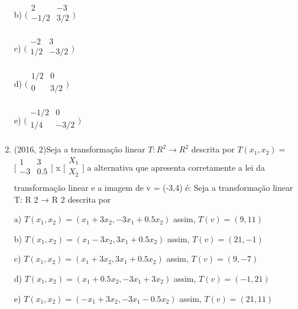 \documentclass{article}
\begin{document}
\begin{enumerate}
b)
$\Bigg(
    \begin{array}{cc}
    2 & -3 \\
    -1/2 & 3/2 \\
\end{array}\Bigg)$

c)
$\Bigg(
    \begin{array}{cc}
    -2 & 3 \\
    1/2 & -3/2 \\
\end{array}\Bigg)$

d)
$\Bigg(
    \begin{array}{cc}
    1/2 & 0 \\
    0 & 3/2 \\
\end{array}\Bigg)$

e)
$\Bigg(
    \begin{array}{cc}
    -1/2 & 0 \\
    1/4 & -3/2 \\
\end{array}\Bigg)$\newline




\item (2016, 2)Seja a transformação linear $T:R^2 \rightarrow R^2$ descrita por $T(x_1,x_2)= $ $\Bigg[
    \begin{array}{cccc}
    1 & 3 \\
    -3 & 0.5 \\
\end{array}\Bigg]$ x $\Bigg[
    \begin{array}{cccc}
    X_1 \\
    X_2  \\
\end{array}\Bigg]$
a alternativa que apresenta corretamente a lei da transformação linear e a imagem de v = (-3,4) é: Seja a transformação linear T: R 2 → R 2 descrita por\newline

a) $T(x_1 , x_2 ) = (x_1 + 3x_2 , -3x_1 + 0.5x_2 )$ assim, $T(v) = (9,11)$

b) $T(x_1 , x_2 ) = (x_1 - 3x_2 , 3x_1 + 0.5x_2 )$ assim, $T(v) = (21, -1)$

c) $T(x_1 , x_2 ) = (x_1 + 3x_2 , 3x_1 + 0.5x_2 )$ assim, $T(v) = (9, -7)$

d) $T(x_1 , x_2 ) = (x_1 + 0.5x_2 , -3x_1 + 3x_2 )$ assim, $T(v) = (-1,21)$

e) $T(x_1 , x_2 ) = (-x_1 + 3x_2 , -3x_1 − 0.5x_2 )$ assim, $T(v) = (21,11)$ \newline




\end{enumerate}
\end{document}
